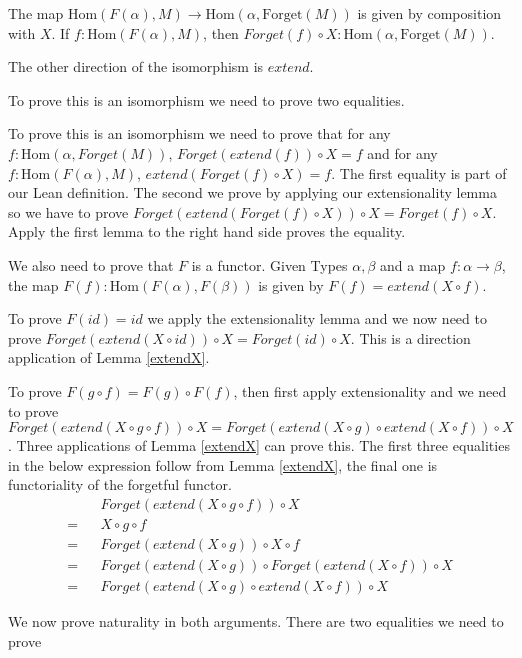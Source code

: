 \documentclass[12pt]{article} %
\theoremstyle{definition}
\theoremstyle{definition}
\theoremstyle{definition}
\theoremstyle{definition}
\begin{document}
The map $\text{Hom}(F(\alpha), M) \rightarrow \text{Hom}(\alpha, \text{Forget}(M))$ is given by composition
with $X$. If $f : \text{Hom}(F(\alpha), M)$, then 
$Forget(f) \circ X : \text{Hom}(\alpha, \text{Forget}(M))$.

The other direction of the isomorphism is $extend$.

To prove this is an isomorphism we need to prove two equalities.

To prove this is an isomorphism we need to prove that for any
 $f : \text{Hom}(\alpha, Forget(M))$, $Forget(extend (f)) \circ X = f$ and
for any $f : \text{Hom}(F(\alpha), M)$, $extend (Forget(f) \circ X) = f$. 
The first equality is part of our Lean definition. The second we prove by applying
our extensionality lemma so we have to prove $Forget(extend (Forget(f) \circ X)) \circ X = Forget(f) \circ X$.
Apply the first lemma to the right hand side proves the equality.

We also need to prove that $F$ is a functor. Given  Types $\alpha, \beta$ and a map $f : \alpha \to \beta$,
the map $F(f) : \text{Hom}(F(\alpha), F(\beta))$ is given by $F(f) = extend (X \circ f)$.

To prove $F(id) = id$ we apply the extensionality lemma and we now need to prove 
$Forget(extend (X \circ id)) \circ X = Forget(id) \circ X$. This is a direction application 
of Lemma \ref{extendX}.

To prove $F(g \circ f) = F(g) \circ F(f)$, then first apply extensionality and 
we need to prove $Forget(extend (X \circ g \circ f)) \circ X = 
  Forget(extend (X \circ g) \circ extend (X \circ f)) \circ X$. Three applications of Lemma \ref{extendX}
  can prove this. The first three equalities in the below expression follow from Lemma \ref{extendX},
  the final one is functoriality of the forgetful functor.
\begin{equation}
  \begin{aligned}
    && Forget(extend (X \circ g \circ f)) \circ X \\
  = && X \circ g \circ f \\
  = && Forget(extend (X \circ g)) \circ X \circ f \\
  = && Forget(extend (X \circ g)) \circ Forget(extend (X \circ f)) \circ X \\
  = && Forget(extend (X \circ g) \circ extend (X \circ f)) \circ X
  \end{aligned}
\end{equation}

We now prove naturality in both arguments. There are two equalities we need to prove
\end{document}
